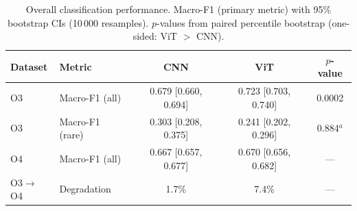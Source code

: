 \begin{table}
\centering
\caption{Overall classification performance. Macro-F1 (primary metric) with 95\% bootstrap CIs (10\,000 resamples). $p$-values from paired percentile bootstrap (one-sided: ViT $>$ CNN).}
\label{tab:overall}
\begin{tabular}{llccc}
\hline\hline
Dataset & Metric & CNN & ViT & $p$-value \\
\hline
O3 & Macro-F1 (all) & 0.679 [0.660, 0.694] & 0.723 [0.703, 0.740] & 0.0002 \\
O3 & Macro-F1 (rare) & 0.303 [0.208, 0.375] & 0.241 [0.202, 0.296] & 0.884$^{a}$ \\  %
O4 & Macro-F1 (all) & 0.667 [0.657, 0.677] & 0.670 [0.656, 0.682] & --- \\
O3$\to$O4 & Degradation & 1.7\% & 7.4\% & --- \\
\hline\hline
\end{tabular}
\smallskip  %
\end{table}